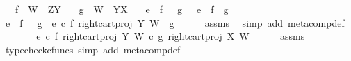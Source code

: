 \begin{isabellebody}
\ \ \ {\isachardoublequoteopen}f\ {\isacharcolon}{\kern0pt}\ W\ {\isasymrightarrow}\ Z\isactrlbsup Y\isactrlesup {\isachardoublequoteclose}\isanewline
\ \ \ {\isachardoublequoteopen}g\ {\isacharcolon}{\kern0pt}\ W\ {\isasymrightarrow}\ Y\isactrlbsup X\isactrlesup {\isachardoublequoteclose}\isanewline
\ \ \ {\isachardoublequoteopen}{\isacharparenleft}{\kern0pt}e\ {\isasymbox}\ f{\isacharparenright}{\kern0pt}\ {\isasymbox}\ \ g\ \ {\isacharequal}{\kern0pt}\ e\ {\isasymbox}\ {\isacharparenleft}{\kern0pt}f\ {\isasymbox}\ g{\isacharparenright}{\kern0pt}{\isachardoublequoteclose}\isanewline
%
\isadelimproof
%
\endisadelimproof
%
\isatagproof
{}\isamarkupfalse%
\ {\isacharminus}{\kern0pt}\isanewline
\ \ \isamarkupfalse%
\ {\isachardoublequoteopen}{\isacharparenleft}{\kern0pt}e\ {\isasymbox}\ f{\isacharparenright}{\kern0pt}\ {\isasymbox}\ \ g\ {\isacharequal}{\kern0pt}\ {\isacharparenleft}{\kern0pt}e\isactrlsup {\isasymflat}\ {\isasymcirc}\isactrlsub c\ {\isasymlangle}f\isactrlsup {\isasymflat}{\isacharcomma}{\kern0pt}\ right{\isacharunderscore}{\kern0pt}cart{\isacharunderscore}{\kern0pt}proj\ Y\ W{\isasymrangle}{\isacharparenright}{\kern0pt}\isactrlsup {\isasymsharp}\ {\isasymbox}\ g{\isachardoublequoteclose}\isanewline
\ \ \ \ \isamarkupfalse%
\ assms\ \isamarkupfalse%
\ {\isacharparenleft}{\kern0pt}simp\ add{\isacharcolon}{\kern0pt}\ meta{\isacharunderscore}{\kern0pt}comp{}{\isacharunderscore}{\kern0pt}def{}{\isacharparenright}{\kern0pt}\isanewline
\ \ \isamarkupfalse%
\ \isamarkupfalse%
\ {\isachardoublequoteopen}{\isachardot}{\kern0pt}{\isachardot}{\kern0pt}{\isachardot}{\kern0pt}\ {\isacharequal}{\kern0pt}\ {\isacharparenleft}{\kern0pt}{\isacharparenleft}{\kern0pt}e\isactrlsup {\isasymflat}\ {\isasymcirc}\isactrlsub c\ {\isasymlangle}f\isactrlsup {\isasymflat}{\isacharcomma}{\kern0pt}\ right{\isacharunderscore}{\kern0pt}cart{\isacharunderscore}{\kern0pt}proj\ Y\ W{\isasymrangle}{\isacharparenright}{\kern0pt}\isactrlsup {\isasymsharp}\isactrlsup {\isasymflat}\ {\isasymcirc}\isactrlsub c\ {\isasymlangle}g\isactrlsup {\isasymflat}{\isacharcomma}{\kern0pt}\ right{\isacharunderscore}{\kern0pt}cart{\isacharunderscore}{\kern0pt}proj\ X\ W{\isasymrangle}{\isacharparenright}{\kern0pt}\isactrlsup {\isasymsharp}{\isachardoublequoteclose}\isanewline
\ \ \ \ \isamarkupfalse%
\ assms\ \isamarkupfalse%
\ {\isacharparenleft}{\kern0pt}typecheck{\isacharunderscore}{\kern0pt}cfuncs{\isacharcomma}{\kern0pt}\ simp\ add{\isacharcolon}{\kern0pt}\ meta{\isacharunderscore}{\kern0pt}comp{}{\isacharunderscore}{\kern0pt}def{}{\isacharparenright}{\kern0pt}\isanewline

\end{isabellebody}
